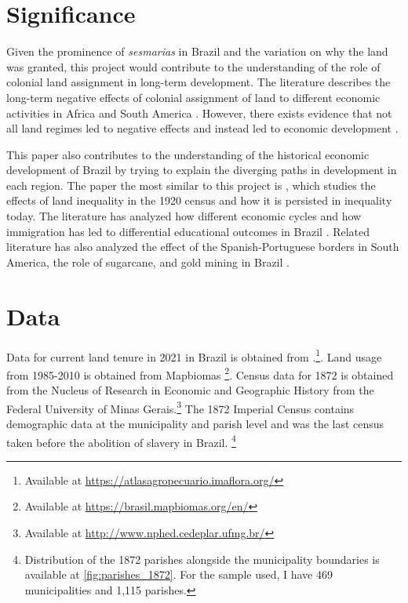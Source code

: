 \documentclass{article}
\begin{document}
\section{Significance}

Given the prominence of \textit{sesmarias} in Brazil and the variation on why the land was granted, this project would contribute to the understanding of the role of colonial land assignment in long-term development.  
The literature describes the long-term negative effects of colonial assignment of land to different economic activities in Africa and South America \parencites{Dell2010-qt}{Lowes2020-pr}.
However, there exists evidence that not all land regimes led to negative effects and instead led to economic development \parencites{Banerjee2005-ki}{Dell2019-np}.  


This paper also contributes to the understanding of the historical economic development of Brazil by trying to explain the diverging paths in development in each region. 
The paper the most similar to this project is \textcite{Wigton-Jones2020-ex}, which studies the effects of land inequality in the 1920 census and how it is persisted in inequality today.
The literature has analyzed how different economic cycles and how immigration has led to differential educational outcomes in Brazil \parencites{Musacchio2014-pq}{Rocha2017-yq}.
Related literature has also analyzed the effect of the Spanish-Portuguese borders in South America, the role of sugarcane, and gold mining in Brazil \parencites{Laudares2022-vy}{Naritomi2012-or}.

\section{Data}

Data for current land tenure in 2021 in Brazil is obtained from \textcite{Sparovek2019-dn}.\footnote{
  Available at \url{https://atlasagropecuario.imaflora.org/}}.
Land usage from 1985-2010 is obtained from Mapbiomas \parencite{Souza2020-kb}\footnote{
  Available at \url{https://brasil.mapbiomas.org/en/}}.
Census data for 1872 is obtained from the Nucleus of Research in Economic and Geographic History from the Federal University of Minas Gerais.\footnote{
  Available at \url{http://www.nphed.cedeplar.ufmg.br/}}
The 1872 Imperial Census contains demographic data at the municipality and parish level and was the last census taken before the abolition of slavery in Brazil. \footnote{Distribution of the 1872 parishes alongside the municipality boundaries is available at \autoref{fig:parishes_1872}. For the sample used, I have 469 municipalities and 1,115 parishes.}
\end{document}
